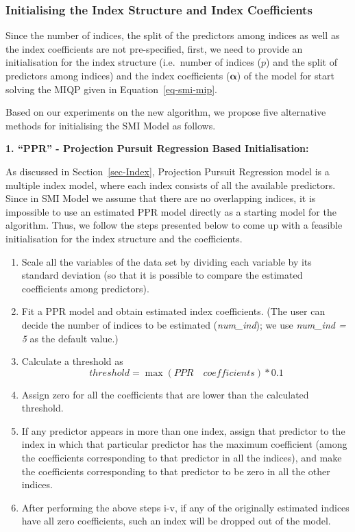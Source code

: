 \documentclass[11pt,a4paper,]{article}
\begin{document}
\hypertarget{sec-step1}{%
\subsubsection{Initialising the Index Structure and Index
Coefficients}\label{sec-step1}}

Since the number of indices, the split of the predictors among indices
as well as the index coefficients are not pre-specified, first, we need
to provide an initialisation for the index structure (i.e.~number of
indices (\(p\)) and the split of predictors among indices) and the index
coefficients (\(\bm{\alpha}\)) of the model for start solving the MIQP
given in Equation~\ref{eq-smi-mip}.

Based on our experiments on the new algorithm, we propose five
alternative methods for initialising the SMI Model as follows.

\textbf{1. ``PPR'' - Projection Pursuit Regression Based
Initialisation:}

As discussed in Section~\ref{sec-Index}, Projection Pursuit Regression
model is a multiple index model, where each index consists of all the
available predictors. Since in SMI Model we assume that there are no
overlapping indices, it is impossible to use an estimated PPR model
directly as a starting model for the algorithm. Thus, we follow the
steps presented below to come up with a feasible initialisation for the
index structure and the coefficients.

\begin{enumerate}
\def\labelenumi{\roman{enumi}.}
\item
  Scale all the variables of the data set by dividing each variable by
  its standard deviation (so that it is possible to compare the
  estimated coefficients among predictors).
\item
  Fit a PPR model and obtain estimated index coefficients. (The user can
  decide the number of indices to be estimated (\emph{num\_ind}); we use
  \emph{num\_ind = 5} as the default value.)
\item
  Calculate a threshold as \[
    threshold = \max(PPR \quad coefficients) * 0.1
  \]
\item
  Assign zero for all the coefficients that are lower than the
  calculated threshold.
\item
  If any predictor appears in more than one index, assign that predictor
  to the index in which that particular predictor has the maximum
  coefficient (among the coefficients corresponding to that predictor in
  all the indices), and make the coefficients corresponding to that
  predictor to be zero in all the other indices.
\item
  After performing the above steps i-v, if any of the originally
  estimated indices have all zero coefficients, such an index will be
  dropped out of the model.
\end{enumerate}
\end{document}
